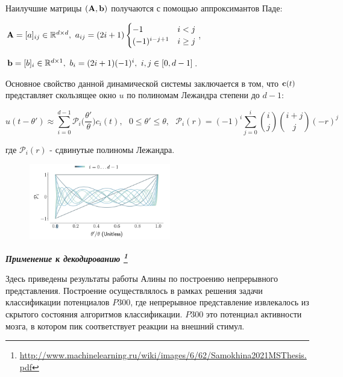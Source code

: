 Наилучшие матрицы $(\textbf{A}, \textbf{b})$ получаются с помощью аппроксимантов Паде:

\begin{center}
    $\textbf{A} = [a]_{ij} \in \mathbb{R}^{d\times d}, \text{ } a_{ij} = (2i+1)
    \begin{cases}
        -1 & i < j \\
        (-1)^{i-j+1} & i\ge j\\
    \end{cases}$,
\end{center}
\begin{center}
    $\textbf{b} = [b]_i \in \mathbb{R}^{d\times 1},  \text{ } b_i = (2i+1)(-1)^i,  \text{ } i, j \in [0, d-1]$.
\end{center}

Основное свойство данной динамической системы заключается в том, что $\textbf{c}(t)$ представляет скользящее окно $u$ по полиномам Лежандра степени до $d-1$:

\begin{equation*}
    u(t-\theta') \approx \sum\limits_{i=0}^{d-1} \mathcal{P}_i\Bigg(\frac{\theta'}{\theta}\Bigg)c_i(t), \text{ } 0\le \theta' \le \theta, \text{ } \mathcal{P}_i(r) = (-1)^i\sum\limits_{j=0}^i\binom{i}{j}\binom{i+j}{j}(-r)^j
\end{equation*}

где $\mathcal{P}_i(r)$ - сдвинутые полиномы Лежандра.
\begin{figure}[!h]
	\centering
	\includegraphics[width=0.55\textwidth]{chapters/varenik1/legendre.png}
\end{figure}

\textit{\textbf{Применение к декодированию \footnote{\url{http://www.machinelearning.ru/wiki/images/6/62/Samokhina2021MSThesis.pdf}}}}

Здесь приведены результаты работы Алины по построению непрерывного представления. Построение осуществлялось в рамках решения задачи классификации потенциалов $P300$, где непрерывное представление извлекалось из скрытого состояния алгоритмов классификации. $P300$ это потенциал активности мозга, в котором пик соответствует реакции на внешний стимул. 


